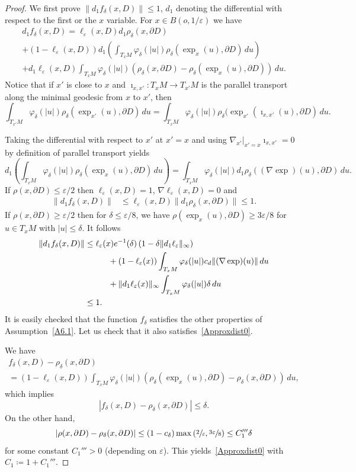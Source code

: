 \documentclass[10pt]{amsart}
\let\epsilon\varepsilon
\theoremstyle{plain}
\theoremstyle{definition}
\newcommand\df{\coloneqq}
\newcommand{\lt}{\left}
\newcommand{\rt}{\right}
\let\d\delta
\let\e\varepsilon
\let\n\nabla
\let\pa\partial
\let\iy\infty
\begin{document}
\begin{proof}
We first prove
$\|d_1 f_\d(x,D)\|\le 1$, $d_1$ denoting the differential with respect to the first or the $x$ variable.
For $x\in B(o,1/\e)$
we have
\begin{multline}
d_1f_\d(x,D)=\ell_\e(x,D)d_1\rho_\d(x,\partial D)\\
+(1-\ell_\e(x,D))d_1\left(\int_{T_xM}\varphi_\d(\vert u\vert )\rho_\d(\exp_x(u),\partial D)\, du\right)\\
+d_1\ell_\e(x,D)\int_{T_xM}\varphi_\d(\vert u\vert )\left(\rho_\d(x,\partial D)-\rho_\d(\exp_x(u),\partial D)\right)\, du.
\end{multline}
Notice that if $x'$ is close to $x$ and $\imath_{x,x'}:T_{x}M\to T_{x'}M$ is the parallel transport along the minimal geodesic from $x$ to $x'$, then
\[
\int_{T_{x'}M}\varphi_\d(\vert u\vert )\rho_\d(\exp_{x'}(u),\partial D)\, du=\int_{T_{x}M}\varphi_\d(\vert u\vert )\rho_\d(\exp_{x'}(\imath_{x,x'}(u),\partial D)\, du.
\]

Taking the differential with respect to $x'$ at $x'=x$ and using $\n_{x'}\vert_{x'=x}\imath_{x,x'}=0$ by definition of parallel transport yields
\[
d_1\left(\int_{T_{x}M}\varphi_\d(\vert u\vert )\rho_\d(\exp_{x}(u),\partial D)\, du\right)=\int_{T_{x}M}\varphi_\d(\vert u\vert )d_1\rho_\d((\n\exp)(u),\partial D)\, du.
\]
If $\rho(x,\partial D)\le \e/2$ then $\ell_\e(x,D)=1$, $\n\ell_\e(x,D)=0$ and
\begin{align*}
\|d_1f_\d(x,D)\|&\le \ell_\e(x,D)\|d_1\rho_\d(x,\partial D)\|\le 1.
\end{align*}
If $\rho(x,\partial D)\ge \e/2$ then for $\d\le \e/8$, we have $\rho(\exp_x(u),\pa D)\geq 3\e/8$ for $u\in T_xM$ with $\vert u\vert \leq \delta$. It follows
\begin{align*}
\|d_1f_\d(x,D)\|&\le\ell_\e(x)e^{-1}(\d)\left(1-\d \|d_1\ell_\e\|_\infty\right)\\
&\hspace*{1cm}+(1-\ell_\e(x))\int_{T_xM}\varphi_\d(\vert u\vert )c_d\|(\n\exp)(u)\|\, du\\
&\hspace*{1cm}+\|d_1\ell_\e(x)\|_\iy\int_{T_xM}\varphi_\d(\vert u\vert )\d\, du\\&\le 1.
\end{align*}
It is easily checked that the function $f_\d$ satisfies the other properties of Assumption~\ref{A6.1}. Let us check that it also satisfies~\eqref{Approxdist0}.
\par
We have
\begin{multline}\label{5.4.6.1}
f_\d(x,D)-\rho_\d(x,\partial D)\\
=(1-\ell_\e(x,D))\int_{T_xM}\varphi_\d(\vert u\vert )\left(\rho_\d(\exp_x(u),\partial D)-\rho_\d(x,\partial D)\right)\, du,
\end{multline}
which implies
\[
\left|f_\d(x,D)-\rho_\d(x,\partial D)\right|\le \d.
\]
On the other hand,
\[
\vert \rho(x,\partial D)-\rho_\d(x,\partial D)\vert\le
(1-c_\delta) \max \lt(\sfrac2\epsilon, \sfrac{3\epsilon}8\rt)
\le C_1'''\d
\]
for some constant $C_1'''>0$ (depending on $\e$).
This yields~\eqref{Approxdist0} with $C_1\df 1+C_1'''$.


\end{proof}
\end{document}

